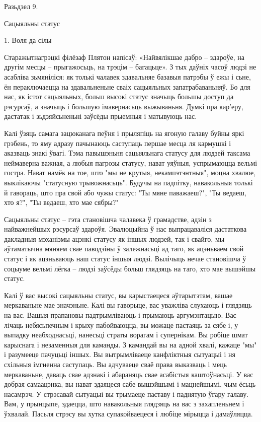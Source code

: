 Разьдзел 9. 

Сацыяльны статус


1. Воля да сілы

Старажытнагрэцкі філёзаф Плятон напісаў: «Найвялікшае дабро – здароўе, на другім месцы – прыгажосьць, на трэцім – багацьце». З тых даўніх часоў людзі не асабліва зьмяніліся: як толькі чалавек здавальняе базавыя патрэбы ў ежы і сьне, ён пераключаецца на здавальненьне сваіх сацыяльных запатрабаваньняў. Бо для нас, як істот сацыяльных, больш высокі статус значыць большы доступ да рэсурсаў, а значыць і большую імавернасьць выжываньня. Думкі пра кар'еру, дастатак і зьдзяйсьненьні заўсёды прыемныя і матывуюць нас.

Калі ўзяць самага зацюканага пеўня і прыляпіць на ягоную галаву буйны яркі грэбень, то яму адразу пачынаюць саступаць першае месца ля кармушкі і аказваць знакі ўвагі. Тэма павышэньня сацыяльнага статусу для людзей таксама неймаверна важная, а любыя пагрозы статусу, нават уяўныя, успрымаюцца вельмі гостра. Нават намёк на тое, што "мы не крутыя, некампэтэнтныя", моцна хвалюе, выклікаючы "статусную трывожнасьць". Будучы на падпітку, навакольныя толькі й гавораць, што пра свой або чужы статус: "Ты мяне паважаеш?", "Ты ведаеш, хто я?", "Ты ведаеш, хто мае сябры?"

Сацыяльны статус – гэта становішча чалавека ў грамадстве, адзін з найважнейшых рэсурсаў здароўя. Эвалюцыйна ў нас выпрацаваліся дастаткова дакладныя мэханізмы ацэнкі статусу як іншых людзей, так і свайго, мы аўтаматычна мяняем свае паводзіны ў залежнасьці ад таго, як ацэньваем свой статус і як ацэньваюць наш статус іншыя людзі. Вылічыць нечае становішча ў соцыуме вельмі лёгка – людзі заўсёды больш глядзяць на таго, хто мае вышэйшы статус.

Калі ў вас высокі сацыяльны статус, вы карыстаецеся аўтарытэтам, вашае меркаваньне мае значэньне. Калі вы гаворыце, вас уважліва слухаюць і глядзяць на вас. Вашыя прапановы падтрымліваюць і прымаюць аргумэнтацыю. Вас лічаць небясьпечным і крыху пабойваюцца, вы можаце пастаяць за сябе і, у выпадку неабходнасьці, нанесьці страты ворагам і супернікам. Вы робіце шмат карыснага і незаменныя для каманды. З камандай вы на адной хвалі, кажаце "мы" і разумееце пачуцьці іншых. Вы вытрымліваеце канфліктныя сытуацыі і ня схільныя імгненна саступаць. Вы адчуваеце сваё права выказваць і мець меркаваньне, даваць свае адзнакі і абараняць свае асабістыя каштоўнасьці. У вас добрая самаацэнка, вы нават здаяцеся сабе вышэйшымі і мацнейшымі, чым ёсьць насамрэч. У стрэсавай сытуацыі вы трымаеце паставу і паднятую ўгару галаву. Вам, у прынцыпе, здаецца, што навакольныя глядзяць на вас з захапленьнем і ўхвалай. Пасьля стрэсу вы хутка супакойваецеся і любіце мірыцца і дамаўляцца.

